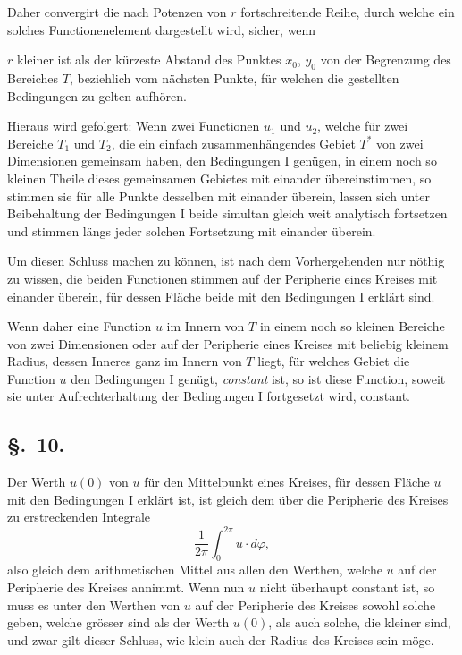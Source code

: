 \documentclass{article}
\begin{document}
Daher convergirt die nach Potenzen von $r$ fortschreitende Reihe, durch welche ein solches Functionenelement dargestellt wird, sicher, wenn

$r$ kleiner ist als der kürzeste Abstand des Punktes $x_0$, $y_0$ von der Begrenzung des Bereiches $T$, beziehlich vom nächsten Punkte, für welchen die gestellten Bedingungen zu gelten aufhören.

Hieraus wird gefolgert: Wenn zwei Functionen $u_1$ und $u_2$, welche für zwei Bereiche $T_1$ und $T_2$, die ein einfach zusammenhängendes Gebiet $T^*$ von zwei Dimensionen gemeinsam haben, den Bedingungen I genügen, in einem noch so kleinen Theile dieses gemeinsamen Gebietes mit einander übereinstimmen, so stimmen sie für alle Punkte desselben mit einander überein, lassen sich unter Beibehaltung der Bedingungen I beide simultan gleich weit analytisch fortsetzen und stimmen längs jeder solchen Fortsetzung mit einander überein.

Um diesen Schluss machen zu können, ist nach dem Vorhergehenden nur nöthig zu wissen, die beiden Functionen stimmen auf der Peripherie eines Kreises mit einander überein, für dessen Fläche beide mit den Bedingungen I erklärt sind.

Wenn daher eine Function $u$ im Innern von $T$ in einem noch so kleinen Bereiche von zwei Dimensionen oder auf der Peripherie eines Kreises mit beliebig kleinem Radius, dessen Inneres ganz im Innern von $T$ liegt, für welches Gebiet die Function $u$ den Bedingungen I genügt, \emph{constant} ist, so ist diese Function, soweit sie unter Aufrechterhaltung der Bedingungen I fortgesetzt wird, constant.

\subsection*{§.~10.}

Der Werth $u(0)$ von $u$ für den Mittelpunkt eines Kreises, für dessen Fläche $u$ mit den Bedingungen I erklärt ist, ist gleich dem über die Peripherie des Kreises zu erstreckenden Integrale
\[
\frac{1}{2\pi} \int_0^{2\pi} u \cdot d\varphi,
\]
also gleich dem arithmetischen Mittel aus allen den Werthen, welche $u$ auf der Peripherie des Kreises annimmt. Wenn nun $u$ nicht überhaupt constant ist, so muss es unter den Werthen von $u$ auf der Peripherie des Kreises sowohl solche geben, welche grösser sind als der Werth $u(0)$, als auch solche, die kleiner sind, und zwar gilt dieser Schluss, wie klein auch der Radius des Kreises sein möge.
\end{document}
